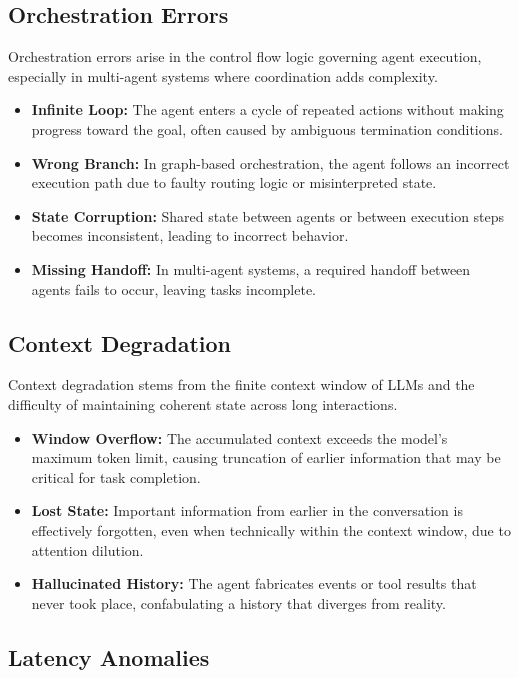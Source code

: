 \documentclass[make,article,submit,moreauthors,pdftex]{mdpi}
\begin{document}
\subsection{Orchestration Errors}

Orchestration errors arise in the control flow logic governing agent execution, especially in multi-agent systems where coordination adds complexity.

\begin{itemize}
  \item \textbf{Infinite Loop:} The agent enters a cycle of repeated actions without making progress toward the goal, often caused by ambiguous termination conditions.
  \item \textbf{Wrong Branch:} In graph-based orchestration, the agent follows an incorrect execution path due to faulty routing logic or misinterpreted state.
  \item \textbf{State Corruption:} Shared state between agents or between execution steps becomes inconsistent, leading to incorrect behavior.
  \item \textbf{Missing Handoff:} In multi-agent systems, a required handoff between agents fails to occur, leaving tasks incomplete.
\end{itemize}

\subsection{Context Degradation}

Context degradation stems from the finite context window of LLMs and the difficulty of maintaining coherent state across long interactions.

\begin{itemize}
  \item \textbf{Window Overflow:} The accumulated context exceeds the model's maximum token limit, causing truncation of earlier information that may be critical for task completion.
  \item \textbf{Lost State:} Important information from earlier in the conversation is effectively forgotten, even when technically within the context window, due to attention dilution.
  \item \textbf{Hallucinated History:} The agent fabricates events or tool results that never took place, confabulating a history that diverges from reality.
\end{itemize}

\subsection{Latency Anomalies}
\end{document}
